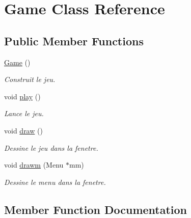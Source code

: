 \hypertarget{classGame}{}\section{Game Class Reference}
\label{classGame}
\subsection*{Public Member Functions}
\begin{DoxyCompactItemize}
\item 
\mbox{\label{classGame_ad59df6562a58a614fda24622d3715b65}} 
\hyperlink{classGame_ad59df6562a58a614fda24622d3715b65}{Game} ()
\begin{DoxyCompactList}\small\item\em Construit le jeu. \end{DoxyCompactList}\item 
\mbox{\label{classGame_aa333825d0bca80e91e53c7e23f053405}} 
void \hyperlink{classGame_aa333825d0bca80e91e53c7e23f053405}{play} ()
\begin{DoxyCompactList}\small\item\em Lance le jeu. \end{DoxyCompactList}\item 
\mbox{\label{classGame_a6d54497ce3a66f6dd45eacfdccc8d0bd}} 
void \hyperlink{classGame_a6d54497ce3a66f6dd45eacfdccc8d0bd}{draw} ()
\begin{DoxyCompactList}\small\item\em Dessine le jeu dans la fenetre. \end{DoxyCompactList}\item 
void \hyperlink{classGame_a783081e1d5e032d547d0e4d64ced4676}{drawm} (Menu $\ast$mm)
\begin{DoxyCompactList}\small\item\em Dessine le menu dans la fenetre. \end{DoxyCompactList}\end{DoxyCompactItemize}


\subsection{Member Function Documentation}
\mbox{\label{classGame_a783081e1d5e032d547d0e4d64ced4676}} 
